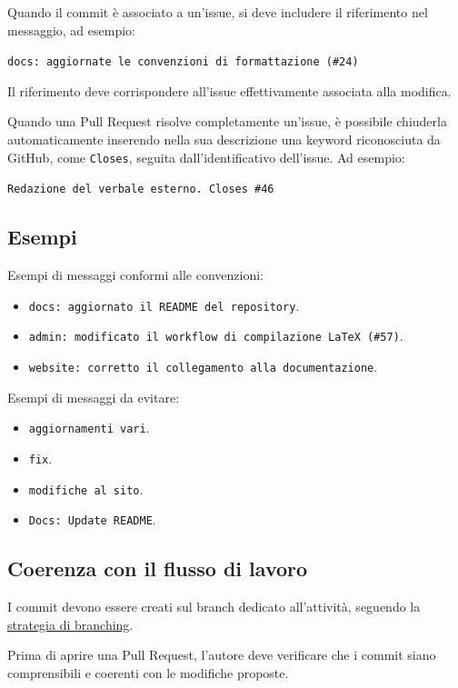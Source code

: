 \documentclass[11pt, a4paper]{article}
\begin{document}
Quando il commit è associato a un'issue, si deve includere il riferimento nel messaggio, ad esempio:

\noindent \texttt{docs: aggiornate le convenzioni di formattazione (\#24)}

\noindent Il riferimento deve corrispondere all'issue effettivamente associata alla modifica.

Quando una Pull Request risolve completamente un'issue, è possibile chiuderla automaticamente inserendo nella sua descrizione una keyword riconosciuta da GitHub, come \texttt{Closes}, seguita dall'identificativo dell'issue. Ad esempio:

\noindent \texttt{Redazione del verbale esterno. Closes \#46}

\subsection{Esempi}

Esempi di messaggi conformi alle convenzioni:
\begin{itemize}
    \item \texttt{docs: aggiornato il README del repository}.
    \item \texttt{admin: modificato il workflow di compilazione LaTeX (\#57)}.
    \item \texttt{website: corretto il collegamento alla documentazione}.
\end{itemize}

\noindent Esempi di messaggi da evitare:
\begin{itemize}
    \item \texttt{aggiornamenti vari}.
    \item \texttt{fix}.
    \item \texttt{modifiche al sito}.
    \item \texttt{Docs: Update README}.
\end{itemize}

\subsection{Coerenza con il flusso di lavoro}

I commit devono essere creati sul branch dedicato all'attività, seguendo la \hyperref[subsec:creazione-dei-branch]{strategia di branching}.

Prima di aprire una Pull Request, l'autore deve verificare che i commit siano comprensibili e coerenti con le modifiche proposte.
\end{document}
